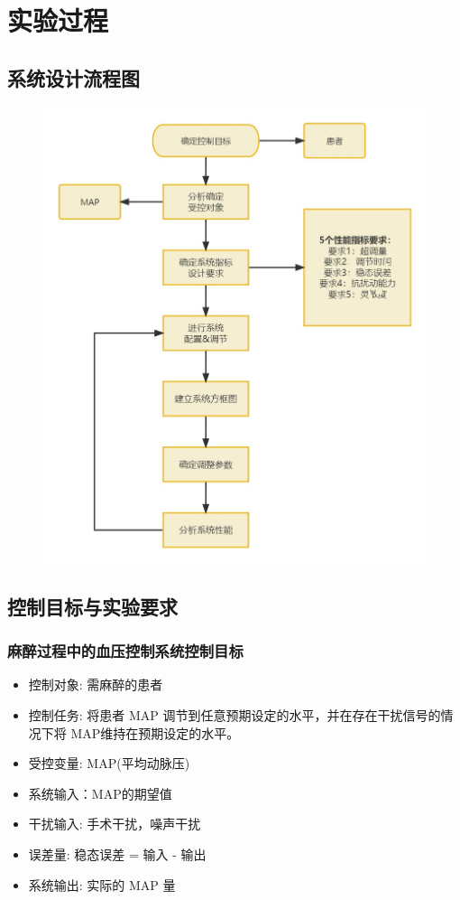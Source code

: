 \documentclass{thuemp}
\begin{document}
\section{实验过程}

\subsection{系统设计流程图}
\begin{figure}[H]
\centering
\includegraphics[width=1\linewidth]{./img/work_stream.jpg}
\end{figure}

\subsection{控制目标与实验要求}

\subsubsection{麻醉过程中的血压控制系统控制目标}
\begin{itemize}
	\item 控制对象: 需麻醉的患者
	\item 控制任务: 将患者 MAP 调节到任意预期设定的水平，并在存在干扰信号的情况下将 MAP维持在预期设定的水平。
	\item 受控变量: MAP(平均动脉压)
	\item 系统输入：MAP的期望值
	\item 干扰输入: 手术干扰，噪声干扰
	\item 误差量: 稳态误差 = 输入 - 输出
	\item 系统输出: 实际的 MAP 量
\end{itemize}
\end{document}
